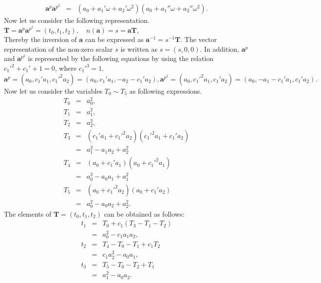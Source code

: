 \begin{eqnarray}\label{eq:mul_aq_aq2}
\textbf{a}^p\textbf{a}^{p^2} & = & (a_0 + a_1'\omega+ a_2'\omega^2)(a_0 + a_1''\omega+ a_2''\omega^2).
\end{eqnarray}
Now let us consider the following representation. \\ $\textbf{T}= \textbf{a}^p\textbf{a}^{p^2}  = (t_0,t_1,t_2), \quad  n(\textbf{a}) =s= \textbf{aT}$,\\
Thereby the inversion of $\textbf{a}$ can be expressed as $\textbf{a}^{-1}= s^{-1}\textbf{T}$.
The vector representation of the non-zero scalar $s$ is written as $s = (s,0,0)$. 
In addition, $\textbf{a}^p$ and $\textbf{a}^{p^2}$ is represented by the following equations by using the relation $c_1'^2+c_1'+1=0$, where $c_1'^3=1$.
\begin{subequations}
\begin{equation}
\textbf{a}^p  =  (a_0, c_1' a_1, c_1'^2 a_2)  =  (a_0, c_1'a_1,-a_2-c_1'a_2),
\end{equation}
\begin{equation}
\textbf{a}^{p^2} =  (a_0, c_1'^2 a_1, c_1' a_2)  =  (a_0, -a_1-c_1'a_1,c_1'a_2).
\end{equation}
\end{subequations}
Now let us consider the variables $T_0 \sim T_5$ as following expressions.
\begin{subequations}
\begin{eqnarray}
 T_0 & = & a_0^2,\nonumber \\
  T_1 & = & a_1^2, \nonumber \\
  T_2 & = & a_2^2, \nonumber \\
 T_3 & = & (c_1'a_1+c_1'^2a_2)(c_1'^2a_1+c_1'a_2)\nonumber \\
 &  = & a_1^2-a_1a_2+a_2^2\nonumber\\
 T_4 & = & (a_0+c_1'a_1)(a_0+c_1'^2a_1)\nonumber\\
 &= &a_0^2-a_0a_1+a_1^2\nonumber\\
 T_5 & = & (a_0+c_1'^2a_2)(a_0+c_1'a_2)\nonumber\\
 &= & a_0^2-a_0a_2+a_2^2.\nonumber
 \end{eqnarray}
\end{subequations}
The elements of $\textbf{T} = (t_0,t_1,t_2)$ can be obtained as follows:
\begin{subequations}
\begin{eqnarray}
t_1  & = &   T_0 + c_1 (T_3 - T_1 - T_2) \nonumber \\
& = & a_0^2 - c_1a_1a_2,\\
t_2 & = & T_4- T_0 - T_1 +c_1 T_2 \nonumber\\
& = & c_1a_2^2 - a_0a_1,\\
t_3 & = & T_5 -T_0 - T_2 +T_1 \nonumber \\
& = & a_1^2 - a_0a_2.
\end{eqnarray}
\end{subequations}
